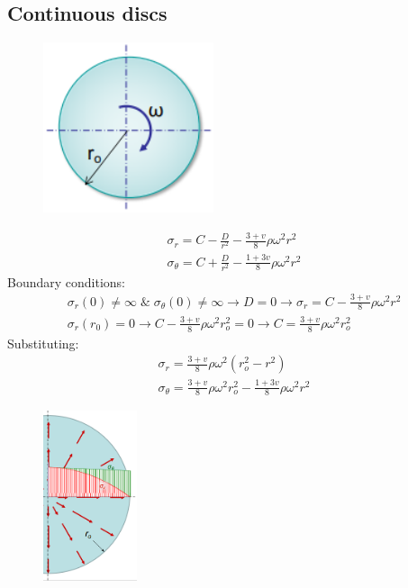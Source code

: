 \documentclass[class=report, crop=false, 12pt,a4paper]{standalone}
\begin{document}
\subsection{Continuous discs}
\begin{figure}[H]
    \centering
    \includegraphics[height = 5cm]{../img/diagram130.png}
    \caption{}
\end{figure}
\begin{gather}
    \sigma_r = C - \frac{D}{r^2} - \frac{3 + v}{8}\rho \omega^2 r^2\\
    \sigma_{\theta} = C + \frac{D}{r^2} - \frac{1+ 3v}{8}\rho\omega^2 r^2 
\end{gather}
Boundary conditions:
\begin{gather}
    \sigma_r (0) \neq \infty \; \& \; \sigma_{\theta} (0) \neq \infty \rightarrow D = 0 \rightarrow \sigma_r = C - \frac{3+v}{8} \rho \omega^2 r^2\\
    \sigma_r \left(r_0\right) = 0 \rightarrow C - \frac{3+v}{8} \rho \omega^2 r^2_o = 0 \rightarrow C = \frac{3+v}{8}\rho \omega^2 r^2_o
\end{gather}
Substituting:
\begin{gather}
    \sigma_r = \frac{3+v}{8} \rho \omega^2 \left(r_o^2 - r^2\right)\\
    \sigma_{\theta} = \frac{3+v}{8}\rho \omega^2 r_o^2 - \frac{1+3v}{8} \rho \omega^2 r^2
\end{gather}
\begin{figure}[H]
    \centering
    \includegraphics[height = 5cm]{../img/diagram131.png}
    \caption{}
\end{figure}
\end{document}
